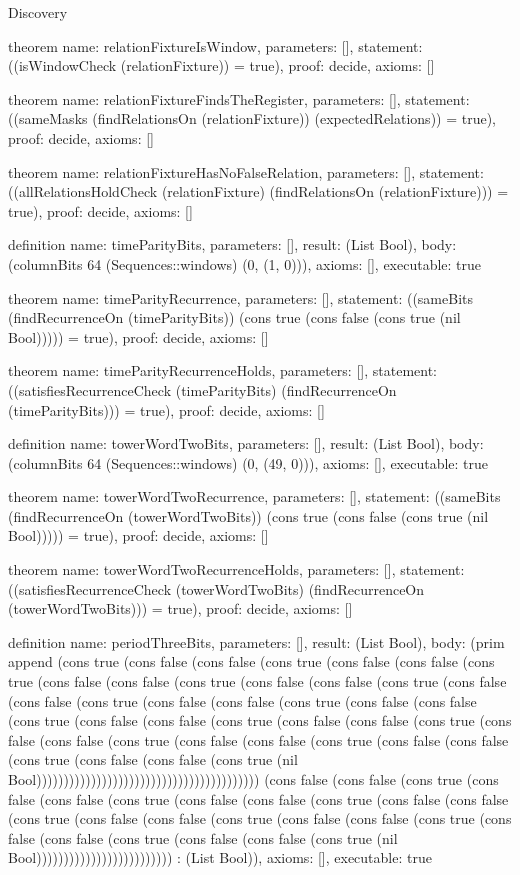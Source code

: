\begin{lexlean}{Discovery}
\begin{semanticmodule}
theorem{
  name: relationFixtureIsWindow,
  parameters: [],
  statement: ((isWindowCheck (relationFixture)) = true),
  proof: decide{},
  axioms: []
}

theorem{
  name: relationFixtureFindsTheRegister,
  parameters: [],
  statement: ((sameMasks (findRelationsOn (relationFixture)) (expectedRelations)) = true),
  proof: decide{},
  axioms: []
}

theorem{
  name: relationFixtureHasNoFalseRelation,
  parameters: [],
  statement: ((allRelationsHoldCheck (relationFixture) (findRelationsOn (relationFixture))) = true),
  proof: decide{},
  axioms: []
}

definition{
  name: timeParityBits,
  parameters: [],
  result: (List Bool),
  body: (columnBits 64 (Sequences::windows) (0, (1, 0))),
  axioms: [],
  executable: true
}

theorem{
  name: timeParityRecurrence,
  parameters: [],
  statement: ((sameBits (findRecurrenceOn (timeParityBits)) (cons true (cons false (cons true (nil Bool))))) = true),
  proof: decide{},
  axioms: []
}

theorem{
  name: timeParityRecurrenceHolds,
  parameters: [],
  statement: ((satisfiesRecurrenceCheck (timeParityBits) (findRecurrenceOn (timeParityBits))) = true),
  proof: decide{},
  axioms: []
}

definition{
  name: towerWordTwoBits,
  parameters: [],
  result: (List Bool),
  body: (columnBits 64 (Sequences::windows) (0, (49, 0))),
  axioms: [],
  executable: true
}

theorem{
  name: towerWordTwoRecurrence,
  parameters: [],
  statement: ((sameBits (findRecurrenceOn (towerWordTwoBits)) (cons true (cons false (cons true (nil Bool))))) = true),
  proof: decide{},
  axioms: []
}

theorem{
  name: towerWordTwoRecurrenceHolds,
  parameters: [],
  statement: ((satisfiesRecurrenceCheck (towerWordTwoBits) (findRecurrenceOn (towerWordTwoBits))) = true),
  proof: decide{},
  axioms: []
}

definition{
  name: periodThreeBits,
  parameters: [],
  result: (List Bool),
  body: (prim append (cons true (cons false (cons false (cons true (cons false (cons false (cons true (cons false (cons false (cons true (cons false (cons false (cons true (cons false (cons false (cons true (cons false (cons false (cons true (cons false (cons false (cons true (cons false (cons false (cons true (cons false (cons false (cons true (cons false (cons false (cons true (cons false (cons false (cons true (cons false (cons false (cons true (cons false (cons false (cons true (nil Bool))))))))))))))))))))))))))))))))))))))))) (cons false (cons false (cons true (cons false (cons false (cons true (cons false (cons false (cons true (cons false (cons false (cons true (cons false (cons false (cons true (cons false (cons false (cons true (cons false (cons false (cons true (cons false (cons false (cons true (nil Bool))))))))))))))))))))))))) : (List Bool)),
  axioms: [],
  executable: true
}


\end{semanticmodule}
\end{lexlean}
